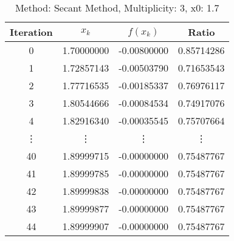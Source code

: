 \begin{table}
\centering
\caption{Method: Secant Method, Multiplicity: 3, x0: 1.7}
\label{tab:table_Secant_Method_3_1_7}
\begin{tabular}{c c c c}
\toprule
Iteration &      $x_k$ &    $f(x_k)$ &      Ratio \\
\midrule
        0 & 1.70000000 & -0.00800000 & 0.85714286 \\
        1 & 1.72857143 & -0.00503790 & 0.71653543 \\
        2 & 1.77716535 & -0.00185337 & 0.76976117 \\
        3 & 1.80544666 & -0.00084534 & 0.74917076 \\
        4 & 1.82916340 & -0.00035545 & 0.75707664 \\
   \vdots &     \vdots &      \vdots &     \vdots \\
       40 & 1.89999715 & -0.00000000 & 0.75487767 \\
       41 & 1.89999785 & -0.00000000 & 0.75487767 \\
       42 & 1.89999838 & -0.00000000 & 0.75487767 \\
       43 & 1.89999877 & -0.00000000 & 0.75487767 \\
       44 & 1.89999907 & -0.00000000 & 0.75487767 \\
\bottomrule
\end{tabular}
\end{table}

